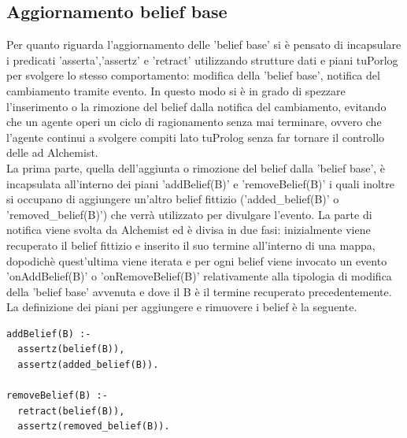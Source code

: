 \documentclass[12pt,a4paper,openright,twoside]{report}
\begin{document}
\subsection{Aggiornamento belief base}
Per quanto riguarda l'aggiornamento delle 'belief base' si \`e pensato di incapsulare i predicati 'asserta','assertz' e 'retract' utilizzando strutture dati e piani tuPorlog per svolgere lo stesso comportamento: modifica della 'belief base', notifica del cambiamento tramite evento. In questo modo si \`e in grado di spezzare l'inserimento o la rimozione del belief dalla notifica del cambiamento, evitando che un agente operi un ciclo di ragionamento senza mai terminare, ovvero che l'agente continui a svolgere compiti lato tuProlog senza far tornare il controllo delle ad Alchemist.
\\
La prima parte, quella dell'aggiunta o rimozione del belief dalla 'belief base', \`e incapsulata all'interno dei piani 'addBelief(B)' e 'removeBelief(B)' i quali inoltre si occupano di aggiungere un'altro belief fittizio ('added\_belief(B)' o 'removed\_belief(B)') che verr\`a utilizzato per divulgare l'evento.
La parte di notifica viene svolta da Alchemist ed \`e divisa in due fasi: inizialmente viene recuperato il belief fittizio e inserito il suo termine all'interno di una mappa, dopodich\`e quest'ultima viene iterata e per ogni belief viene invocato un evento 'onAddBelief(B)' o 'onRemoveBelief(B)' relativamente alla tipologia di modifica della 'belief base' avvenuta e dove il B \`e il termine recuperato precedentemente.
La definizione dei piani per aggiungere e rimuovere i belief \`e la seguente.
\medskip
\begin{lstlisting}[firstnumber=1,caption={Piani per la gestione del bounding-box}]
addBelief(B) :-
  assertz(belief(B)),
  assertz(added_belief(B)).

removeBelief(B) :-
  retract(belief(B)),
  assertz(removed_belief(B)).
\end{lstlisting}
\end{document}
